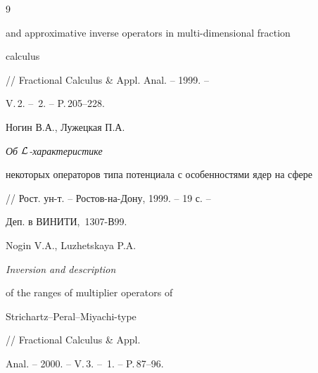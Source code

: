 \begin{thebibliography}{9}
{and approximative inverse operators in multi-dimensional fraction


calculus} // Fractional Calculus \& Appl. Anal. -- 1999. --


V.\,2. -- \No\,2. -- P.\,205--228.







Ногин В.А., Лужецкая П.А. {\em Об ${\cal L}$-характеристике


некоторых операторов типа потенциала с особенностями ядер на сфере}


// Рост. ун-т. -- Ростов-на-Дону, 1999. -- 19 с. --


Деп. в ВИНИТИ, \No\,1307-В99.







Nogin V.A., Luzhetskaya P.A. {\em Inversion and description


of the ranges of multiplier operators of


Strichartz--Peral--Miyachi-type} // Fractional Calculus \& Appl.


Anal. -- 2000. -- V.\,3. -- \No\,1. -- P.\,87--96.





\end{thebibliography}





\vskip 2cm












\label{end}





